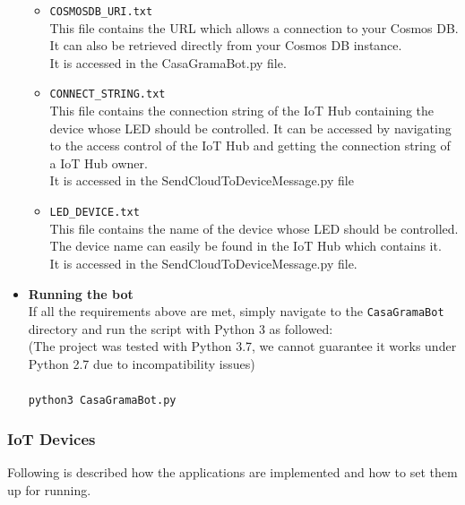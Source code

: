 \documentclass[a4paper]{article}
\begin{document}
\begin{itemize}
\begin{itemize}
						\item \texttt{COSMOSDB\_URI.txt}\\
						This file contains the URL which allows a connection to your Cosmos DB. It can also be retrieved directly from your Cosmos DB instance.\\
						It is accessed in the CasaGramaBot.py file.
						
						\item \texttt{CONNECT\_STRING.txt}\\
						This file contains the connection string of the IoT Hub containing the device whose LED should be controlled.
						It can be accessed by navigating to the access control of the IoT Hub and getting the connection string of a IoT Hub owner.\\
						It is accessed in the SendCloudToDeviceMessage.py file
						
						\item \texttt{LED\_DEVICE.txt}\\
						This file contains the name of the device whose LED should be controlled.
						The device name can easily be found in the IoT Hub which contains it.\\
						It is accessed in the SendCloudToDeviceMessage.py file.\\
						
					\end{itemize}
				
				\item \textbf{Running the bot}\\
				If all the requirements above are met, simply navigate to the \texttt{CasaGramaBot} directory and run the script with Python 3 as followed:\\
				(The project was tested with Python 3.7, we cannot guarantee it works under Python 2.7 due to incompatibility issues)\\
				\\
				\texttt{python3 CasaGramaBot.py}
				
			\end{itemize}
			
			\newpage
			
			\subsubsection{IoT Devices}
			
			Following is described how the applications are implemented and how to set them up for running.
			
\end{document}
